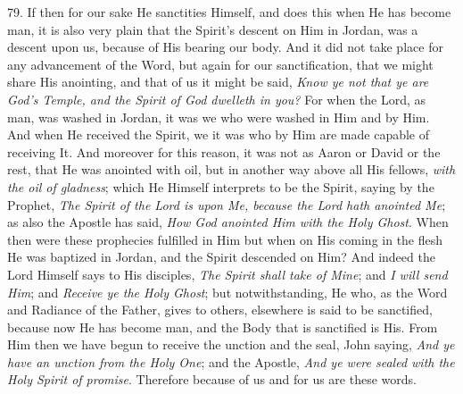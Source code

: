 79. If then for our sake He
sanctities Himself, and does this when He has become man, it is also
very plain that the Spirit's descent on Him in Jordan, was a descent
upon us, because of His bearing our body. And it did not take place
for any advancement of the Word, but again for our sanctification,
that we might share His anointing, and that of us it might be said, \emph{Know
ye not that ye are God's Temple, and the Spirit of God dwelleth in
you?} For when the Lord, as man, was washed in Jordan, it was we
who were washed in Him and by Him. And when He received the Spirit, we
it was who by Him are made capable of receiving It. And moreover for
this reason, it was not as Aaron or David or the rest, that He was
anointed with oil, but in another way above all His fellows, \emph{with
the oil of gladness}; which He Himself interprets to be the Spirit,
saying by the Prophet, \emph{The Spirit of the Lord is upon Me, because
the Lord hath anointed Me}; as also the Apostle has said, \emph{How
God anointed Him with the Holy Ghost}. When then were these
prophecies fulfilled in Him but when on His coming in the flesh He was
baptized in Jordan, and the Spirit descended on Him? And indeed the
Lord Himself says to His disciples, \emph{The Spirit shall take of
Mine}; and \emph{I will send Him}; and \emph{Receive ye the Holy Ghost};
but notwithstanding, He who, as the Word and Radiance of the Father,
gives to others, elsewhere is said to be sanctified, because now He
has become man, and the Body that is sanctified is His. From Him then
we have begun to receive the unction and the seal, John saying, \emph{And
ye have an unction from the Holy One}; and the Apostle, \emph{And ye
were sealed with the Holy Spirit of promise}. Therefore because of
us and for us are these words.

